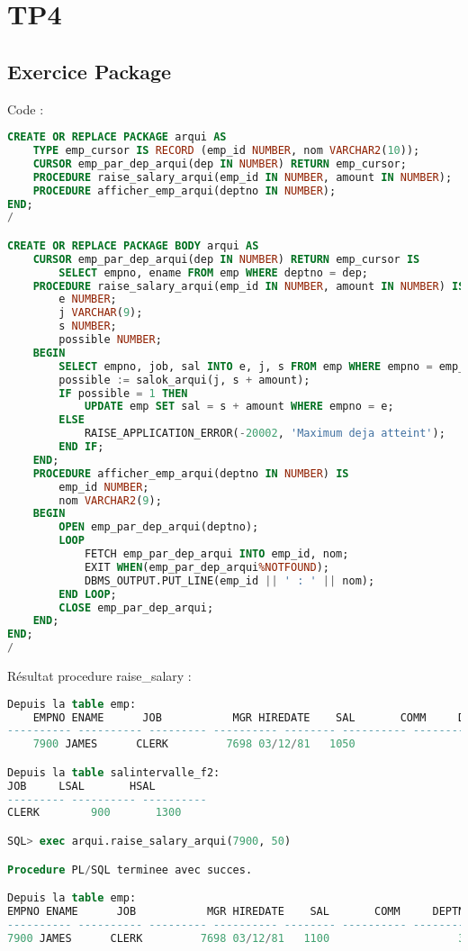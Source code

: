 \documentclass{article}
\begin{document}
\newpage
\section{TP4}
\subsection{Exercice Package}
Code :
\begin{lstlisting}[language=SQL,
    deletekeywords={char},
    morekeywords={DECLARE, LOOP, TYPE, FOR, IF, IS, OPEN, FETCH, DBMS_OUTPUT, PUT_LINE}]
CREATE OR REPLACE PACKAGE arqui AS
	TYPE emp_cursor IS RECORD (emp_id NUMBER, nom VARCHAR2(10));
	CURSOR emp_par_dep_arqui(dep IN NUMBER) RETURN emp_cursor;
	PROCEDURE raise_salary_arqui(emp_id IN NUMBER, amount IN NUMBER);
	PROCEDURE afficher_emp_arqui(deptno IN NUMBER);
END;
/

CREATE OR REPLACE PACKAGE BODY arqui AS
	CURSOR emp_par_dep_arqui(dep IN NUMBER) RETURN emp_cursor IS 
		SELECT empno, ename FROM emp WHERE deptno = dep;
	PROCEDURE raise_salary_arqui(emp_id IN NUMBER, amount IN NUMBER) IS
		e NUMBER;
		j VARCHAR(9);
		s NUMBER;
		possible NUMBER;
	BEGIN
		SELECT empno, job, sal INTO e, j, s FROM emp WHERE empno = emp_id;
		possible := salok_arqui(j, s + amount);
		IF possible = 1 THEN 
			UPDATE emp SET sal = s + amount WHERE empno = e;
		ELSE
			RAISE_APPLICATION_ERROR(-20002, 'Maximum deja atteint');
		END IF;
	END;
	PROCEDURE afficher_emp_arqui(deptno IN NUMBER) IS
		emp_id NUMBER;
		nom VARCHAR2(9);
	BEGIN
		OPEN emp_par_dep_arqui(deptno);
		LOOP
			FETCH emp_par_dep_arqui INTO emp_id, nom;
			EXIT WHEN(emp_par_dep_arqui%NOTFOUND);
			DBMS_OUTPUT.PUT_LINE(emp_id || ' : ' || nom);
		END LOOP;
		CLOSE emp_par_dep_arqui;
	END;
END;
/


\end{lstlisting}

Résultat procedure raise\_salary :
\begin{lstlisting}[language=SQL,
    morekeywords={DECLARE, LOOP, TYPE, FOR, IF, IS, OPEN, FETCH, DBMS_OUTPUT, PUT_LINE}]
Depuis la table emp:
    EMPNO ENAME      JOB	       MGR HIREDATE	   SAL	     COMM     DEPTNO
---------- ---------- --------- ---------- -------- ---------- ---------- ----------
    7900 JAMES      CLERK	      7698 03/12/81	  1050			           30

Depuis la table salintervalle_f2:
JOB		LSAL	   HSAL
--------- ---------- ----------
CLERK		 900	   1300

SQL> exec arqui.raise_salary_arqui(7900, 50)

Procedure PL/SQL terminee avec succes.

Depuis la table emp:
EMPNO ENAME      JOB	       MGR HIREDATE	   SAL	     COMM     DEPTNO
---------- ---------- --------- ---------- -------- ---------- ---------- ----------
7900 JAMES      CLERK	      7698 03/12/81	  1100			          30
\end{lstlisting}
\end{document}
